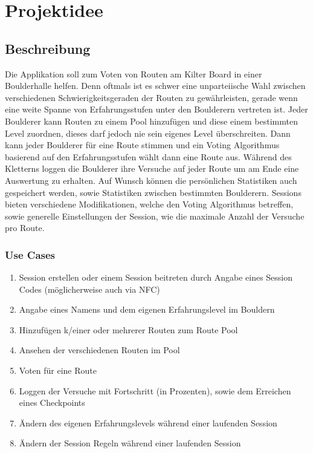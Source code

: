 \documentclass[11pt,a4paper,headsepline,footsepline,bibliography=totocnumbered]{article}
\begin{document}
\pagebreak
\tableofcontents

\newpage

\section{Projektidee}

\subsection{Beschreibung}
  \par
    Die Applikation soll zum Voten von Routen am Kilter Board in einer Boulderhalle helfen.
    Denn oftmals ist es schwer eine unparteiische Wahl zwischen verschiedenen Schwierigkeitsgeraden der Routen zu gewährleisten, gerade wenn eine weite Spanne von Erfahrungsstufen unter den Boulderern vertreten ist.
    Jeder Boulderer kann Routen zu einem Pool hinzufügen und diese einem bestimmten Level zuordnen, dieses darf jedoch nie sein eigenes Level überschreiten.
    Dann kann jeder Boulderer für eine Route stimmen und ein Voting Algorithmus basierend auf den Erfahrungsstufen wählt dann eine Route aus.
    Während des Kletterns loggen die Boulderer ihre Versuche auf jeder Route um am Ende eine Auswertung zu erhalten.
    Auf Wunsch können die persönlichen Statistiken auch gespeichert werden, sowie Statistiken zwischen bestimmten Boulderern.
    Sessions bieten verschiedene Modifikationen, welche den Voting Algorithmus betreffen, sowie generelle Einstellungen der Session, wie die maximale Anzahl der Versuche pro Route.

\subsubsection{Use Cases}
  \begin{enumerate}
    \item Session erstellen oder einem Session beitreten durch Angabe eines Session Codes (möglicherweise auch via NFC)
    \item Angabe eines Namens und dem eigenen Erfahrungslevel im Bouldern
    \item Hinzufügen k/einer oder mehrerer Routen zum Route Pool
    \item Ansehen der verschiedenen Routen im Pool
    \item Voten für eine Route
    \item Loggen der Versuche mit Fortschritt (in Prozenten), sowie dem Erreichen eines Checkpoints
    \item Ändern des eigenen Erfahrungslevels während einer laufenden Session
    \item Ändern der Session Regeln während einer laufenden Session
  \end{enumerate}
\end{document}
